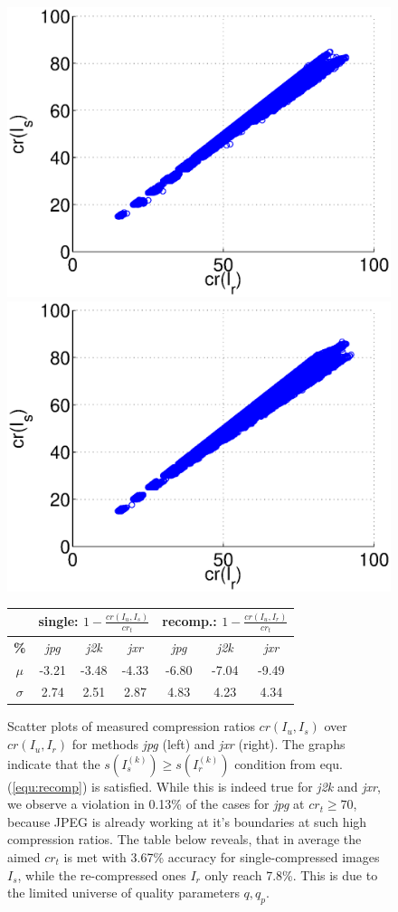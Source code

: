 \documentclass[10pt,twocolumn,letterpaper]{article}
\begin{document}
\begin{figure}
	\begin{small}
	
	\includegraphics[width=0.45\linewidth]{img/jpgData.eps}
	\includegraphics[width=0.45\linewidth]{img/jxrData.eps}
	
	\vspace{3mm}
	\begin{tabular}{c|c|c|c||c|c|c}
		& \multicolumn{3}{c||}{single: $1-\frac{cr(I_u, I_s)}{cr_t}$ } & \multicolumn{3}{c}{recomp.: $ 1-\frac{cr(I_u, I_r)}{cr_t}$} \\
		\hline
		\textbf{\%} & \emph{jpg} & \emph{j2k} & \emph{jxr} & \emph{jpg} & \emph{j2k} & \emph{jxr} \\
		\hline
		$ \mu $ & -3.21 & -3.48	&  -4.33 &  -6.80&   -7.04 &   -9.49 \\
		$ \sigma$ &2.74 &2.51 &  2.87 & 4.83  & 4.23  & 4.34 \\
	\end{tabular}
	
	
	\vspace{2mm}
	
	\end{small}
	
	\caption{Scatter plots of measured compression ratios $cr(I_u, I_s)$ over $cr(I_u, I_r)$ for methods \emph{jpg} (left) and \emph{jxr} (right). The graphs indicate that the $s(I_s^{(k)}) \geq s(I_r^{(k)})$ condition from equ. (\ref{equ:recomp}) is satisfied. While this is indeed true for \emph{j2k} and \emph{jxr}, we observe a violation in 0.13\% of the cases for \emph{jpg} at $cr_t \geq 70$, because JPEG is already working at it's boundaries at such high compression ratios. The table below reveals, that in average the aimed $cr_t$ is met with 3.67\% accuracy for single-compressed images $I_s$, while the re-compressed ones $I_r$ only reach 7.8\%. This is due to the limited universe of quality parameters $q, q_p$.}
	
	
	\label{fig:dataDistribution}
\end{figure}
\end{document}
